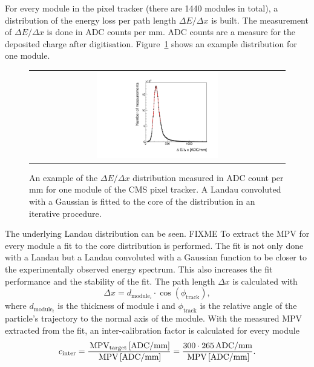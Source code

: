 For every module in the pixel tracker (there are 1440 modules in total), a distribution of the energy loss per path length $\Delta E/\Delta x$ is built.
The measurement of $\Delta E/\Delta x$ is done in ADC counts per mm.
ADC counts are a measure for the deposited charge after digitisation.
Figure~\ref{fig:dEdx_Module} shows an example distribution for one module. 
\begin{figure}[!t]
  \centering 
  \begin{tabular}{c}
  \includegraphics[width=0.49\textwidth]{figures/analysis/Landau_Module_352476680.pdf}
  \end{tabular}
  \caption{An example of the $\Delta E/\Delta x$ distribution measured in ADC count per mm for one module of the CMS pixel tracker. 
           A Landau convoluted with a Gaussian is fitted to the core of the distribution in an iterative procedure.} 
  \label{fig:dEdx_Module}
\end{figure}
The underlying Landau distribution can be seen. FIXME 
To extract the MPV for every module a fit to the core distribution is performed.
The fit is not only done with a Landau but a Landau convoluted with a Gaussian function to be closer to the experimentally observed energy spectrum.
This also increases the fit performance and the stability of the fit.
The path length $\Delta x$ is calculated with
\begin{equation}
\Delta x = d_{\text{module}_i} \cdot \cos(\phi_{\text{track}}),
\end{equation}
where $d_{\text{module}_i}$ is the thickness of module i and $\phi_{\text{track}}$ is the relative angle of the particle's trajectory to the normal axis of the module.
With the measured MPV extracted from the fit, an inter-calibration factor is calculated for every module
\begin{equation}
c_{\text{inter}}=\frac{\,\text{MPV}_{\text{target}}\, [\text{ADC/mm}]}{\,\text{MPV}\, [\text{ADC/mm}]} = \frac{300 \cdot 265 \, \text{ADC/mm}}{\,\text{MPV}\, [\text{ADC/mm}]}.
\end{equation}
